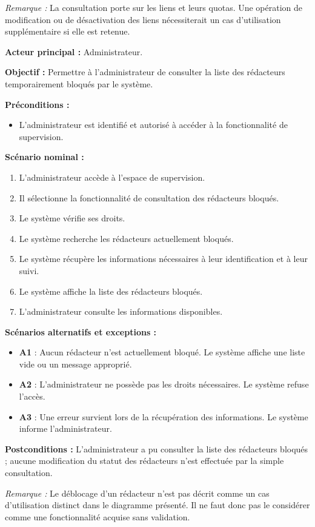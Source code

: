 \begin{description}[leftmargin=0pt, style=nextline, font=\normalfont\bfseries\color{violetprincipal}]
    \textit{Remarque :} La consultation porte sur les liens et leurs quotas. Une opération de modification ou de désactivation des liens nécessiterait un cas d'utilisation supplémentaire si elle est retenue.

    \item[UC12 --- Consulter les rédacteurs bloqués]

    \textbf{Acteur principal :} Administrateur.

    \textbf{Objectif :} Permettre à l'administrateur de consulter la liste des rédacteurs temporairement bloqués par le système.

    \textbf{Préconditions :}
    \begin{itemize}
        \item L'administrateur est identifié et autorisé à accéder à la fonctionnalité de supervision.
    \end{itemize}

    \textbf{Scénario nominal :}
    \begin{enumerate}
        \item L'administrateur accède à l'espace de supervision.
        \item Il sélectionne la fonctionnalité de consultation des rédacteurs bloqués.
        \item Le système vérifie ses droits.
        \item Le système recherche les rédacteurs actuellement bloqués.
        \item Le système récupère les informations nécessaires à leur identification et à leur suivi.
        \item Le système affiche la liste des rédacteurs bloqués.
        \item L'administrateur consulte les informations disponibles.
    \end{enumerate}

    \textbf{Scénarios alternatifs et exceptions :}
    \begin{itemize}
        \item \textbf{A1} : Aucun rédacteur n'est actuellement bloqué. Le système affiche une liste vide ou un message approprié.
        \item \textbf{A2} : L'administrateur ne possède pas les droits nécessaires. Le système refuse l'accès.
        \item \textbf{A3} : Une erreur survient lors de la récupération des informations. Le système informe l'administrateur.
    \end{itemize}

    \textbf{Postconditions :} L'administrateur a pu consulter la liste des rédacteurs bloqués ; aucune modification du statut des rédacteurs n'est effectuée par la simple consultation.

    \textit{Remarque :} Le déblocage d'un rédacteur n'est pas décrit comme un cas d'utilisation distinct dans le diagramme présenté. Il ne faut donc pas le considérer comme une fonctionnalité acquise sans validation.
\end{description}

